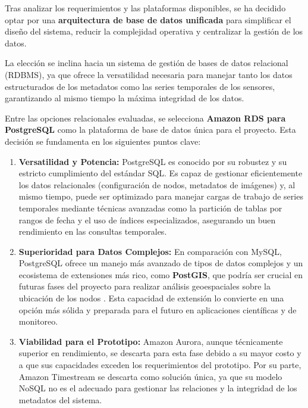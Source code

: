 Tras analizar los requerimientos y las plataformas disponibles, se ha decidido optar por una \textbf{arquitectura de base de datos unificada} para simplificar el diseño del sistema, reducir la complejidad operativa y centralizar la gestión de los datos.

La elección se inclina hacia un sistema de gestión de bases de datos relacional (RDBMS), ya que ofrece la versatilidad necesaria para manejar tanto los datos estructurados de los metadatos como las series temporales de los sensores, garantizando al mismo tiempo la máxima integridad de los datos.

Entre las opciones relacionales evaluadas, se selecciona \textbf{Amazon RDS para PostgreSQL} como la plataforma de base de datos única para el proyecto. Esta decisión se fundamenta en los siguientes puntos clave:

\begin{enumerate}
    \item \textbf{Versatilidad y Potencia:} PostgreSQL es conocido por su robustez y su estricto cumplimiento del estándar SQL. Es capaz de gestionar eficientemente los datos relacionales (configuración de nodos, metadatos de imágenes) y, al mismo tiempo, puede ser optimizado para manejar cargas de trabajo de series temporales mediante técnicas avanzadas como la partición de tablas por rangos de fecha y el uso de índices especializados, asegurando un buen rendimiento en las consultas temporales.
    
    \item \textbf{Superioridad para Datos Complejos:} En comparación con MySQL, PostgreSQL ofrece un manejo más avanzado de tipos de datos complejos y un ecosistema de extensiones más rico, como \textbf{PostGIS}, que podría ser crucial en futuras fases del proyecto para realizar análisis geoespaciales sobre la ubicación de los nodos \cite{postgresql2024about}. Esta capacidad de extensión lo convierte en una opción más sólida y preparada para el futuro en aplicaciones científicas y de monitoreo.

    \item \textbf{Viabilidad para el Prototipo:} Amazon Aurora, aunque técnicamente superior en rendimiento, se descarta para esta fase debido a su mayor costo y a que sus capacidades exceden los requerimientos del prototipo. Por su parte, Amazon Timestream se descarta como solución única, ya que su modelo NoSQL no es el adecuado para gestionar las relaciones y la integridad de los metadatos del sistema.
\end{enumerate}

